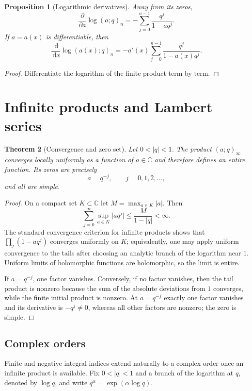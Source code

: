 \documentclass[11pt,oneside,openany]{book}
\newtheorem{theorem}{Theorem}[chapter]
\newtheorem{proposition}[theorem]{Proposition}
\theoremstyle{definition}
\theoremstyle{remark}
\newcommand{\C}{\mathbb C}
\newcommand{\dd}{\,\mathrm d}
\newcommand{\abs}[1]{\lvert #1\rvert}
\begin{document}
\begin{proposition}[Logarithmic derivatives]\label{prop:logder-finite}
Away from its zeros,
\[
 \frac{\partial}{\partial a}\log(a;q)_n
 =-\sum_{j=0}^{n-1}\frac{q^j}{1-aq^j}.
\]
If $a=a(x)$ is differentiable, then
\[
 \frac{\dd}{\dd x}\log(a(x);q)_n
 =-a'(x)\sum_{j=0}^{n-1}\frac{q^j}{1-a(x)q^j}.
\]
\end{proposition}

\begin{proof}
Differentiate the logarithm of the finite product term by term.
\end{proof}

\section{Infinite products and Lambert series}

\begin{theorem}[Convergence and zero set]\label{thm:poch-entire}
Let $0<\abs q<1$.  The product $(a;q)_\infty$ converges locally uniformly as a function of $a\in\C$ and therefore defines an entire function.  Its zeros are precisely
\[
 a=q^{-j},\qquad j=0,1,2,\ldots,
\]
and all are simple.
\end{theorem}

\begin{proof}
On a compact set $K\subset\C$ let $M=\max_{a\in K}\abs a$.  Then
\[
 \sum_{j=0}^{\infty}\sup_{a\in K}\abs{a q^j}
 \le \frac{M}{1-\abs q}<\infty.
\]
The standard convergence criterion for infinite products shows that
\(
 \prod_j(1-aq^j)
\)
converges uniformly on $K$; equivalently, one may apply uniform convergence to the tails after choosing an analytic branch of the logarithm near $1$.  Uniform limits of holomorphic functions are holomorphic, so the limit is entire.

If $a=q^{-j}$, one factor vanishes.  Conversely, if no factor vanishes, then the tail product is nonzero because the sum of the absolute deviations from $1$ converges, while the finite initial product is nonzero.  At $a=q^{-j}$ exactly one factor vanishes and its derivative is $-q^j\ne0$, whereas all other factors are nonzero; the zero is simple.
\end{proof}

\subsection{Complex orders}

Finite and negative integral indices extend naturally to a complex order once an infinite product is available.  Fix $0<\abs q<1$ and a branch of the logarithm at $q$, denoted by $\log q$, and write $q^\alpha=\exp(\alpha\log q)$.
\end{document}
